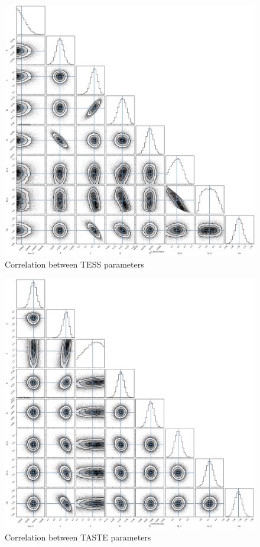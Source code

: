 \documentclass[a4paper,11pt,twocolumn]{article}
\begin{document}
\begin{figure}[H]
    \centering
      \includegraphics[scale=0.38, angle=0]{../pictures/tess/acf_tess.pdf}
       \caption{Correlation between TESS parameters}
\end{figure}

\begin{figure}[H]
    \centering
      \includegraphics[scale=0.38, angle=0]{../pictures/taste/acf_taste.pdf}
      \caption{Correlation between TASTE parameters}
\end{figure}
\end{document}
